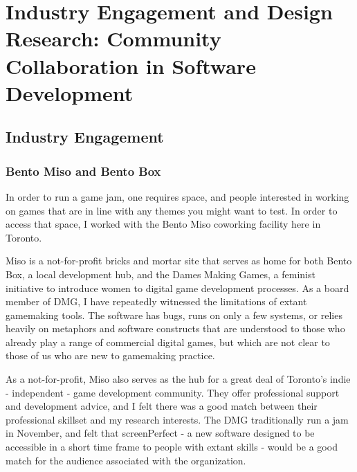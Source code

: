 
\chapter{Industry Engagement and Design Research: Community Collaboration in Software Development} %

\label{Chapter4} %


\section{Industry Engagement}

\subsection{Bento Miso and Bento Box}
In order to run a game jam, one requires space, and people interested in working on games that are in line with any themes you might want to test. In order to access that space, I worked with the Bento Miso coworking facility here in Toronto.

Miso is a not-for-profit bricks and mortar site that serves as home for both Bento Box, a local development hub, and the Dames Making Games, a feminist initiative to introduce women to digital game development processes. As a board member of DMG, I have repeatedly witnessed the limitations of extant gamemaking tools. The software has bugs, runs on only a few systems, or relies heavily on metaphors and software constructs that are understood to those who already play a range of commercial digital games, but which are not clear to those of us who are new to gamemaking practice.

As a not-for-profit, Miso also serves as the hub for a great deal of Toronto's indie - independent - game development community. They offer professional support and development advice, and I felt there was a good match between their professional skillset and my research interests. The DMG traditionally run a jam in November, and felt that screenPerfect - a new software designed to be accessible in a short time frame to people with extant skills - would be a good match for the audience associated with the organization.

